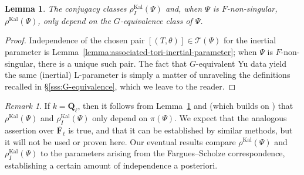 \documentclass[reqno]{amsart}
\numberwithin{equation}{subsection}
\newcommand{\F}{\mathbf{F}}
\newcommand{\Q}{\mathbf{Q}}
\newcommand{\ol}[1]{\overline{#1}}
\newcommand\cT{\mathcal{T}}
\DeclareMathOperator{\Kal}{Kal}
\newtheorem{lemma}[thm]{Lemma}
\theoremstyle{remark}
\newtheorem{remark}[thm]{Remark}
\numberwithin{equation}{subsection}
\numberwithin{figure}{subsection}
\begin{document}
\begin{lemma}\label{lemma:kaletha-parameter-choice-independence}
The conjugacy classes $\rho_I^{\Kal}(\Psi)$ and, when $\Psi$ is $F$-non-singular, $\rho^{\Kal}(\Psi)$, only depend on the $G$-equivalence class of $\Psi$.
\end{lemma}

\begin{proof}
Independence of the chosen pair $[(T, \theta)] \in \cT(\Psi)$ for the inertial parameter is Lemma~\ref{lemma:associated-tori-inertial-parameter}; when $\Psi$ is $F$-non-singular, there is a unique such pair. The fact that $G$-equivalent Yu data yield the same (inertial) L-parameter is simply a matter of unraveling the definitions recalled in \S\ref{sss:G-equivalence}, which we leave to the reader.
\end{proof}


\begin{remark}
If $k = \ol\Q_\ell$, then it follows from Lemma~\ref{lemma:kaletha-parameter-choice-independence} and \cite[Corollary 3.5.5]{Kal19} (which builds on \cite[Theorem 6.6]{HM08}) that $\rho^{\Kal}(\Psi)$ and $\rho_I^{\Kal}(\Psi)$ only depend on $\pi(\Psi)$. We expect that the analogous assertion over $\ol\F_\ell$ is true, and that it can be established by similar methods, but it will not be used or proven here. Our eventual results compare $\rho^{\Kal}(\Psi)$ and $\rho^{\Kal}_I(\Psi)$ to the parameters arising from the Fargues--Scholze correspondence, establishing a certain amount of independence a posteriori.
\end{remark}
\end{document}
